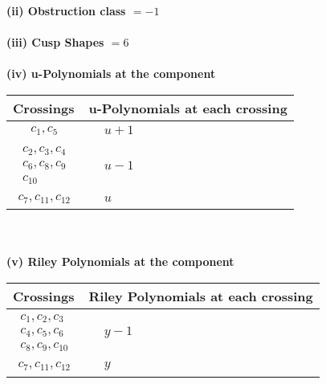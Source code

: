 \documentclass[1p]{elsarticle_modified}
\theoremstyle{definition}
\begin{document}
\flushleft \textbf{(ii) Obstruction class $= -1$}\\~\\
\flushleft \textbf{(iii) Cusp Shapes $= 6$}\\~\\
\newpage\renewcommand{\arraystretch}{1}
\flushleft \textbf{(iv) u-Polynomials at the component}\newline \\
\begin{tabular}{m{50pt}|m{274pt}}
Crossings & \hspace{64pt}u-Polynomials at each crossing \\
\hline $$\begin{aligned}c_{1},c_{5}\end{aligned}$$&$\begin{aligned}
&u+1
\end{aligned}$\\
\hline $$\begin{aligned}c_{2},c_{3},c_{4}\\c_{6},c_{8},c_{9}\\c_{10}\end{aligned}$$&$\begin{aligned}
&u-1
\end{aligned}$\\
\hline $$\begin{aligned}c_{7},c_{11},c_{12}\end{aligned}$$&$\begin{aligned}
&u
\end{aligned}$\\
\hline
\end{tabular}\\~\\
\newpage\renewcommand{\arraystretch}{1}
\flushleft \textbf{(v) Riley Polynomials at the component}\newline \\
\begin{tabular}{m{50pt}|m{274pt}}
Crossings & \hspace{64pt}Riley Polynomials at each crossing \\
\hline $$\begin{aligned}c_{1},c_{2},c_{3}\\c_{4},c_{5},c_{6}\\c_{8},c_{9},c_{10}\end{aligned}$$&$\begin{aligned}
&y-1
\end{aligned}$\\
\hline $$\begin{aligned}c_{7},c_{11},c_{12}\end{aligned}$$&$\begin{aligned}
&y
\end{aligned}$\\
\hline
\end{tabular}\\~\\
\end{document}
